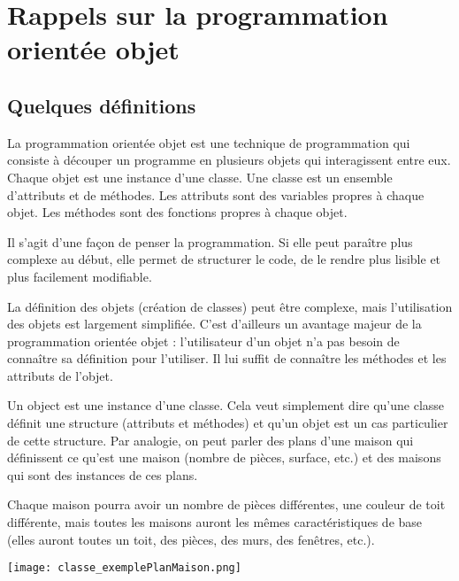 
\section{Rappels sur la programmation orientée objet}
\subsection{Quelques définitions}

La programmation orientée objet est une technique de programmation qui consiste à découper un programme en plusieurs objets qui interagissent entre eux. 
Chaque objet est une instance d'une classe. Une classe est un ensemble d'attributs et de méthodes. Les attributs sont des variables propres à chaque objet. Les méthodes sont des fonctions propres à chaque objet.

Il s'agit d'une façon de penser la programmation. Si elle peut paraître plus complexe au début, elle permet de structurer le code, de le rendre plus lisible et plus facilement modifiable. 

La définition des objets (création de classes) peut être complexe, mais l'utilisation des objets est largement simplifiée. C'est d'ailleurs un avantage majeur de la programmation orientée objet : l'utilisateur d'un objet n'a pas besoin de connaître sa définition pour l'utiliser. Il lui suffit de connaître les méthodes et les attributs de l'objet.


Un object est une instance d'une classe. Cela veut simplement dire qu'une classe définit une structure (attributs et méthodes) et qu'un objet est un cas particulier de cette structure. Par analogie, on peut parler des plans d'une maison qui définissent ce qu'est une maison (nombre de pièces, surface, etc.) et des maisons qui sont des instances de ces plans. 

Chaque maison pourra avoir un nombre de pièces différentes, une couleur de toit différente, mais toutes les maisons auront les mêmes caractéristiques de base (elles auront toutes un toit, des pièces, des murs, des fenêtres, etc.).

\begin{center}
    \texttt{[image: classe\_exemplePlanMaison.png]} 
\end{center}


